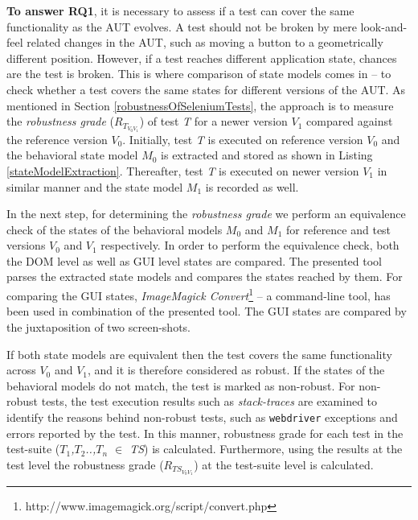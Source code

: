 \textbf{To answer RQ1}, it is necessary to assess if a test can cover the same functionality as the AUT evolves. A test should not be broken by mere look-and-feel related changes in the AUT, such as moving a button to a geometrically different position. However, if a test reaches different application state, chances are the test is broken. This is where comparison of state models comes in -- to check whether a test covers the same states for different versions of the AUT. As mentioned in Section \ref{robustnessOfSeleniumTests}, the approach is to measure the  \textit{robustness grade} ($R_{T_{V_{0}V_{1}}}$) of test \textit{T} for a newer version \textit{$V_{1}$} compared against the reference version \textit{$V_{0}$}. Initially, test \textit{T} is executed on reference version \textit{$V_{0}$} and the behavioral state model \textit{$M_{0}$} is extracted and stored as shown in Listing \ref{stateModelExtraction}. Thereafter, test \textit{T} is executed on newer version \textit{$V_{1}$} in similar manner and the state model \textit{$M_{1}$} is recorded as well.

In the next step, for determining the \textit{robustness grade} we perform an equivalence check of the states of the behavioral models  \textit{$M_{0}$} and \textit{$M_{1}$} for reference and test versions \textit{$V_{0}$} and \textit{$V_{1}$} respectively.  
In order to perform the equivalence check, both the DOM level as well as GUI level states are compared. The presented tool parses the extracted state models and compares the states reached by them. For comparing the GUI states, \textit{ImageMagick Convert}\footnote{http://www.imagemagick.org/script/convert.php} -- a command-line tool, has been used in combination of the presented tool. The GUI states are compared by the juxtaposition of two screen-shots. 

If both state models are equivalent then the test covers the same functionality across  \textit{$V_{0}$} and \textit{$V_{1}$}, and it is therefore considered as robust. If the states of the behavioral models do not match, the test is marked as non-robust. For non-robust tests, the test execution results such as \textit{stack-traces} are examined to identify the reasons behind non-robust tests, such as \texttt{webdriver} exceptions \cite{SeleniumExceptions} and errors reported by the test. In this manner, robustness grade for each test in the test-suite (\textit{$T_1$,$T_2$..,$T_n$ $\in$ TS}) is calculated. Furthermore, using the results at the test level the robustness grade ($R_{TS_{V_{0}V_{1}}}$) at the test-suite level is calculated.

